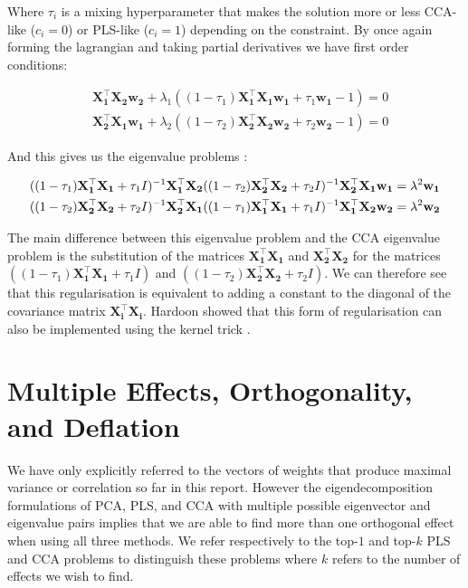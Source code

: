 Where $\tau_i$ is a mixing hyperparameter that makes the solution more or less CCA-like ($c_i=0$) or PLS-like ($c_i=1$) depending on the constraint. By once again forming the lagrangian and taking partial derivatives we have first order conditions:

\begin{align}
     & \mathbf{X_1^{\top}X_2w_2} + \lambda_1((1-\tau_1)\mathbf{X_1^{\top}X_1w_1}+\tau_1\mathbf{w_1}-1)=0 \\
     & \mathbf{X_2^{\top}X_1w_1} + \lambda_2((1-\tau_2)\mathbf{X_2^{\top}X_2w_2}+\tau_2\mathbf{w_2}-1)=0
\end{align}

And this gives us the eigenvalue problems \cite{rosipal2005overview}:

\begin{align}
     & ((1-\tau_1)\mathbf{X_1^{\top}X_1}+\tau_1I)^{-1}\mathbf{X_1^{\top}X_2}((1-\tau_2)\mathbf{X_2^{\top}X_2}+\tau_2I)^{-1}\mathbf{X_2^{\top}X_1w_1}=\lambda^2\mathbf{w_1} \notag \\
     & ((1-\tau_2)\mathbf{X_2^{\top}X_2}+\tau_2I)^{-1}\mathbf{X_2^{\top}X_1}((1-\tau_1)\mathbf{X_1^{\top}X_1}+\tau_1I)^{-1}\mathbf{X_1^{\top}X_2w_2}=\lambda^2\mathbf{w_2}
\end{align}

The main difference between this eigenvalue problem and the CCA eigenvalue problem is the substitution of the matrices $\mathbf{X_1^{\top}X_1}$ and $\mathbf{X_2^{\top}X_2}$ for the matrices $((1-\tau_1)\mathbf{X_1^{\top}X_1}+\tau_1I)$ and $((1-\tau_2)\mathbf{X_2^{\top}X_2}+\tau_2I)$. We can therefore see that this regularisation is equivalent to adding a constant to the diagonal of the covariance matrix $\mathbf{X_i^{\top}X_i}$. Hardoon showed that this form of regularisation can also be implemented using the kernel trick \cite{hardoon2004canonical}.

\section{Multiple Effects, Orthogonality, and Deflation}\label{sec:orthogonality}

We have only explicitly referred to the vectors of weights that produce maximal variance or correlation so far in this report. However the eigendecomposition formulations of PCA, PLS, and CCA with multiple possible eigenvector and eigenvalue pairs implies that we are able to find more than one orthogonal effect when using all three methods. We refer respectively to the top-$1$ and top-$k$ PLS and CCA problems to distinguish these problems where $k$ refers to the number of effects we wish to find.

